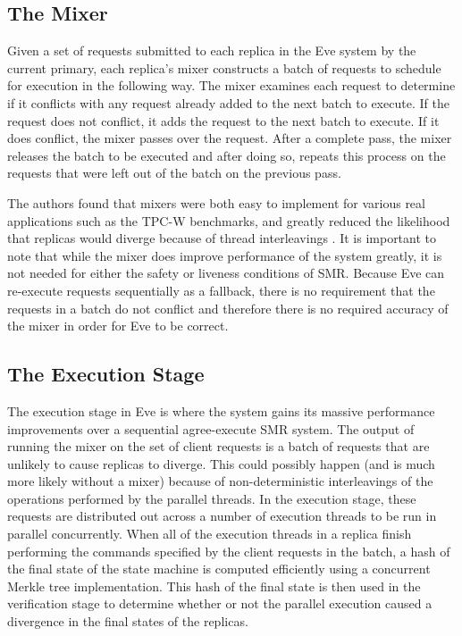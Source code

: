 \documentclass[11pt, oneside]{report}
\begin{document}
\subsection{The Mixer}\label{EveMixer}
Given a set of requests submitted to each replica in the Eve system by the current primary, each replica's mixer constructs a batch of requests to schedule for execution in the following way. 
The mixer examines each request to determine if it conflicts with any request already added to the next batch to execute. 
If the request does not conflict, it adds the request to the next batch to execute. 
If it does conflict, the mixer passes over the request. 
After a complete pass, the mixer releases the batch to be executed and after doing so, repeats this process on the requests that were left out of the batch on the previous pass.

The authors found that mixers were both easy to implement for various real applications such as the TPC-W benchmarks, and greatly reduced the likelihood that replicas would diverge because of thread interleavings \cite{eve}. 
It is important to note that while the mixer does improve performance of the system greatly, it is not needed for either the safety or liveness conditions of SMR. 
Because Eve can re-execute requests sequentially as a fallback, there is no requirement that the requests in a batch do not conflict and therefore there is no required accuracy of the mixer in order for Eve to be correct.

\subsection{The Execution Stage}\label{EveExecution}

The execution stage in Eve is where the system gains its massive performance improvements over a sequential agree-execute SMR system. 
The output of running the mixer on the set of client requests is a batch of requests that are unlikely to cause replicas to diverge. 
This could possibly happen (and is much more likely without a mixer) because of non-deterministic interleavings of the operations performed by the parallel threads.
In the execution stage, these requests are distributed out across a number of execution threads to be run in parallel concurrently. 
When all of the execution threads in a replica finish performing the commands specified by the client requests in the batch, a hash of the final state of the state machine is computed efficiently using a concurrent Merkle tree implementation. 
This hash of the final state is then used in the verification stage to determine whether or not the parallel execution caused a divergence in the final states of the replicas.
\end{document}

